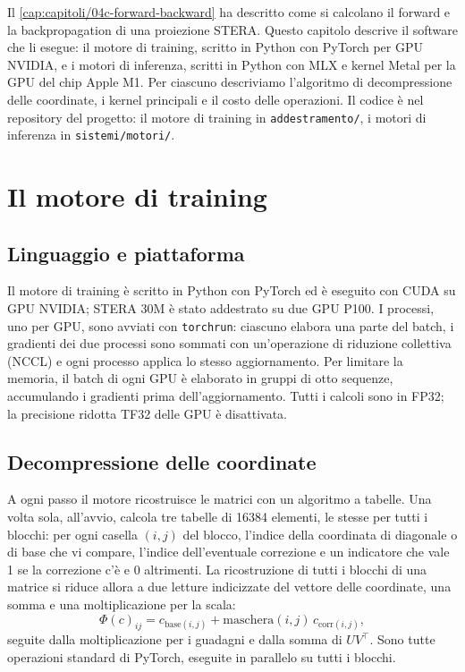 Il \autoref{cap:capitoli/04c-forward-backward} ha descritto come si calcolano il forward e la backpropagation di una proiezione STERA. Questo capitolo descrive il software che li esegue: il motore di training, scritto in Python con PyTorch per GPU NVIDIA, e i motori di inferenza, scritti in Python con MLX e kernel Metal per la GPU del chip Apple M1. Per ciascuno descriviamo l'algoritmo di decompressione delle coordinate, i kernel principali e il costo delle operazioni. Il codice è nel repository del progetto: il motore di training in \texttt{addestramento/}, i motori di inferenza in \texttt{sistemi/motori/}.

\section{Il motore di training}
\label{sec:motore-training}

\subsection{Linguaggio e piattaforma}
Il motore di training è scritto in Python con PyTorch ed è eseguito con CUDA su GPU NVIDIA; STERA 30M è stato addestrato su due GPU P100. I processi, uno per GPU, sono avviati con \texttt{torchrun}: ciascuno elabora una parte del batch, i gradienti dei due processi sono sommati con un'operazione di riduzione collettiva (NCCL) e ogni processo applica lo stesso aggiornamento. Per limitare la memoria, il batch di ogni GPU è elaborato in gruppi di otto sequenze, accumulando i gradienti prima dell'aggiornamento. Tutti i calcoli sono in FP32; la precisione ridotta TF32 delle GPU è disattivata.

\subsection{Decompressione delle coordinate}
\label{sec:ricostruzione-training}
A ogni passo il motore ricostruisce le matrici con un algoritmo a tabelle. Una volta sola, all'avvio, calcola tre tabelle di \num{16384} elementi, le stesse per tutti i blocchi: per ogni casella $(i,j)$ del blocco, l'indice della coordinata di diagonale o di base che vi compare, l'indice dell'eventuale correzione e un indicatore che vale 1 se la correzione c'è e 0 altrimenti. La ricostruzione di tutti i blocchi di una matrice si riduce allora a due letture indicizzate del vettore delle coordinate, una somma e una moltiplicazione per la scala:
\[
\Phi(c)_{ij}=c_{\mathrm{base}(i,j)}+\mathrm{maschera}(i,j)\,c_{\mathrm{corr}(i,j)} ,
\]
seguite dalla moltiplicazione per i guadagni e dalla somma di $UV^\top$. Sono tutte operazioni standard di PyTorch, eseguite in parallelo su tutti i blocchi.

